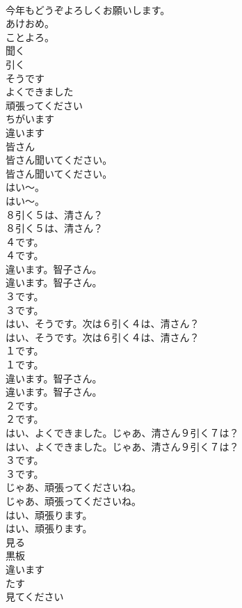 \documentclass[8pt]{extreport}
\begin{document}
\begin{CJK}{UTF8}{min}
\\	今年もどうぞよろしくお願いします。
\\	あけおめ。
\\	ことよろ。
\\	聞く
\\	引く
\\	そうです
\\	よくできました
\\	頑張ってください
\\	ちがいます
\\	違います
\\	皆さん
\\	皆さん聞いてください。	
\\	皆さん聞いてください。 
\\	はい〜。	
\\	はい〜。 
\\	８引く５は、清さん？	
\\	８引く５は、清さん？ 
\\	４です。	
\\	４です。 
\\	違います。智子さん。	
\\	違います。智子さん。 
\\	３です。	
\\	３です。 
\\	はい、そうです。次は６引く４は、清さん？	
\\	はい、そうです。次は６引く４は、清さん？ 
\\	１です。	
\\	１です。 
\\	違います。智子さん。	
\\	違います。智子さん。 
\\	２です。	
\\	２です。 
\\	はい、よくできました。じゃあ、清さん９引く７は？	
\\	はい、よくできました。じゃあ、清さん９引く７は？ 
\\	３です。	
\\	３です。 
\\	じゃあ、頑張ってくださいね。	
\\	じゃあ、頑張ってくださいね。 
\\	はい、頑張ります。	
\\	はい、頑張ります。 
\\	見る
\\	黒板
\\	違います
\\	たす
\\	見てください

\end{CJK}
\end{document}
